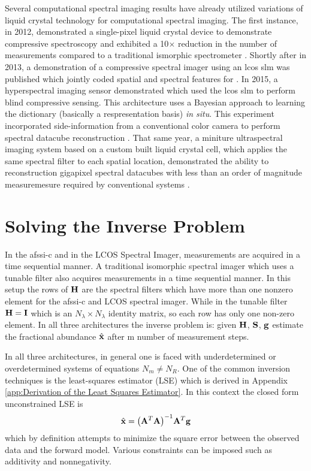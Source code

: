 Several computational spectral imaging results have already utilized variations of liquid crystal technology for computational spectral imaging. The first instance, in 2012, demonstrated a single-pixel liquid crystal device to demonstrate compressive spectroscopy and exhibited a 10$\times$ reduction in the number of measurements compared to a traditional ismorphic spectrometer \cite{august2013compressive}. Shortly after in 2013, a demonstration of a compressive spectral imager using an \gls{lcos} \gls{slm} was published which jointly coded spatial and spectral features for \cite{zhu2013coded}. In 2015, a  hyperspectral imaging sensor demonstrated which used the \gls{lcos} \gls{slm} to perform blind compressive sensing. This architecture uses a Bayesian approach to learning the dictionary (basically a respresentation basis) \emph{in situ}. This experiment incorporated side-information from a conventional color camera to perform spectral datacube reconstruction \cite{yuan2015compressive}. That same year, a miniture ultraspectral imaging system based on a custom built liquid crystal cell, which applies the same spectral filter to each spatial location, demonstrated the ability to reconstruction gigapixel spectral datacubes with less than an order of magnitude measuremesure required by conventional systems \cite{august2016miniature}. 


\section{Solving the Inverse Problem}

In the \gls{afssi-c} and in the LCOS Spectral Imager, measurements are acquired in a time sequential manner. A traditional isomorphic spectral imager which uses a tunable filter also acquires measurements in a time sequential manner. In this setup the rows of $\displaystyle \mathbf{H}$ are the spectral filters which have more than one nonzero element for the \gls{afssi-c} and LCOS spectral imager. While in the tunable filter $\displaystyle \mathbf{H} = \displaystyle \mathbf{I}$ which is an $N_{\lambda} \times N_{\lambda}$ identity matrix, so each row has only one non-zero element.  In all three architectures the inverse problem is: given $\displaystyle \mathbf{H}$, $\displaystyle \mathbf{S}$, $\displaystyle \mathbf{g}$ estimate the fractional abundance $\hat{ \displaystyle \mathbf{x} }$ after m number of measurement steps.


In all three architectures, in general one is faced with underdetermined or overdetermined systems of equations $N_m \neq N_{R}$. One of the common inversion techniques is the least-squares estimator (LSE) \cite{keshava2003survey} which is derived in Appendix \ref{app:Derivation of the Least Squares Estimator}. In this context the closed form unconstrained LSE is
%
\begin{equation}
	\mbh{x} = \ap{ \mb{A}^T \mb{A} }^{-1} \mb{A}^T \mb{g}
\end{equation}
%
which by definition attempts to minimize the square error between the observed data and the forward model. Various constraints can be imposed such as additivity and nonnegativity. 

